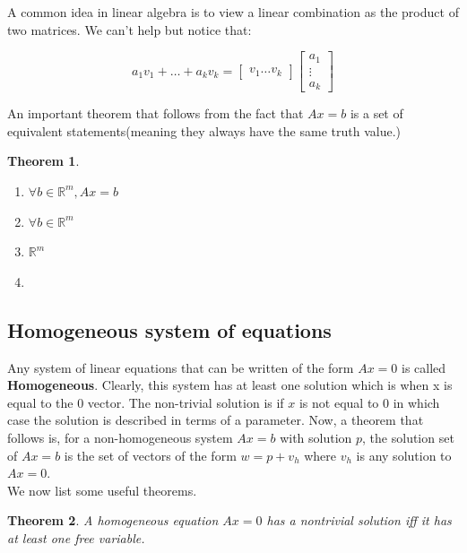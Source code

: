 \documentclass[titlepage]{article}
\newtheorem{thm}{Theorem}[subsection]
\numberwithin{equation}{subsection}
\begin{document}
A common idea in linear algebra is to view a linear combination as the product of two matrices. We can't help but notice that:

\begin{equation*}
    a_{1}v_{1} + \ldots + a_{k}v_{k} = \begin{bmatrix}
        v_{1}  \ldots v_{k}
    \end{bmatrix} \begin{bmatrix}
        a_{1} \\
        \vdots \\
        a_{k}
    \end{bmatrix}
\end{equation*}

An important theorem that follows from the fact that $Ax=b$ is a set of equivalent statements(meaning they always have the same truth value.) 

\begin{thm}
\begin{enumerate}
    \item $\forall b \in \mathbb{R}^{m}, Ax=b$ 
    \item $ \forall b \in \mathbb{R}^{m}$ 
    \item {} $\mathbb{R}^{m}$
    \item {}
\end{enumerate}
\end{thm}

\subsection{Homogeneous system of equations}

Any system of linear equations that can be written of the form $Ax = 0$ is called \textbf{Homogeneous}. Clearly, this system has at least one solution which is when x is equal to the 0 vector. The non-trivial solution is if $x$ is not equal to 0 in which case the solution is described in terms of a parameter. Now, a theorem that follows is, for a non-homogeneous system $Ax=b$ with solution $p$, the solution set of $Ax=b$ is the set of vectors of the form $w = p + v_{h}$ where $v_{h}$ is any solution to $Ax = 0$.
\\ We now list some useful theorems. 
\begin{thm}
A homogeneous equation $Ax = 0$ has a nontrivial solution iff it has at least one free variable.
\end{thm}
\end{document}
